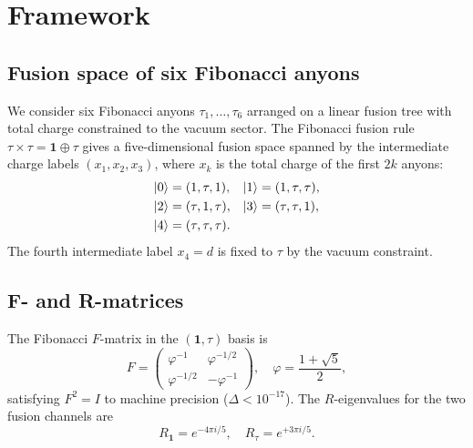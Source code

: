 \documentclass[aps,pra,twocolumn,superscriptaddress,longbibliography,floatfix,nofootinbib]{revtex4-2}
\begin{document}
\section{Framework}
\label{sec:framework}

\subsection{Fusion space of six Fibonacci anyons}

We consider six Fibonacci anyons $\tau_1,\ldots,\tau_6$ arranged on a
linear fusion tree with total charge constrained to the vacuum
sector.
The Fibonacci fusion rule $\tau\times\tau = \mathbf{1}\oplus\tau$
gives a five-dimensional fusion space spanned by the intermediate
charge labels $(x_1,x_2,x_3)$, where $x_k$ is the total charge of
the first $2k$ anyons:
\begin{equation}
\label{eq:basis}
\begin{aligned}
\ket{0} &= (1,\tau,1), &
\ket{1} &= (1,\tau,\tau), \\
\ket{2} &= (\tau,1,\tau), &
\ket{3} &= (\tau,\tau,1), \\
\ket{4} &= (\tau,\tau,\tau). &
\end{aligned}
\end{equation}
The fourth intermediate label $x_4=d$ is fixed to $\tau$ by the
vacuum constraint.

\subsection{F- and R-matrices}

The Fibonacci $F$-matrix in the $(\mathbf{1},\tau)$ basis is
\begin{equation}
\label{eq:F}
F = \begin{pmatrix}
\varphi^{-1} & \varphi^{-1/2} \\
\varphi^{-1/2} & -\varphi^{-1}
\end{pmatrix},
\quad \varphi = \frac{1+\sqrt{5}}{2},
\end{equation}
satisfying $F^2 = I$ to machine precision ($\Delta < 10^{-17}$).
The $R$-eigenvalues for the two fusion channels are
\begin{equation}
\label{eq:R}
R_{\mathbf{1}} = e^{-4\pi i/5}, \quad
R_\tau = e^{+3\pi i/5}.
\end{equation}
\end{document}
